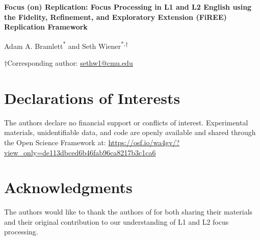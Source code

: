 \documentclass[man, floatsintext, letterpaper, 12pt, donotrepeattitle]{apa7}
\title{} %
\author{} %
\affiliation{} %
\begin{document}
\begin{titlepage}
\centering
\vspace*{1cm}

{\LARGE \bfseries Focus (on) Replication: Focus Processing in L1 and L2 English using the Fidelity, Refinement, and Exploratory Extension (FiREE) Replication Framework \par}

\vspace{1.5cm}

{\large Adam A. Bramlett\textsuperscript{*} and Seth Wiener\textsuperscript{*,†} \par}

\vspace{1em}


\vspace{1em}

{\small †Corresponding author: \href{mailto:sethw1@cmu.edu}{sethw1@cmu.edu} \par}

\vspace{1.5cm}

\section*{Declarations of Interests}
\noindent The authors declare no financial support or conflicts of interest. Experimental materials, unidentifiable data, and code are openly available and shared through the Open Science Framework at: \url{https://osf.io/wa4gv/?view_only=de113dbced6b46fab96ca8217b3c1ca6}

\vspace{1cm}

\section*{Acknowledgments}
\noindent The authors would like to thank the authors of \cite{ge2021a} for both sharing their materials and their original contribution to our understanding of L1 and L2 focus processing.

\end{titlepage}






%


%
\end{document}
